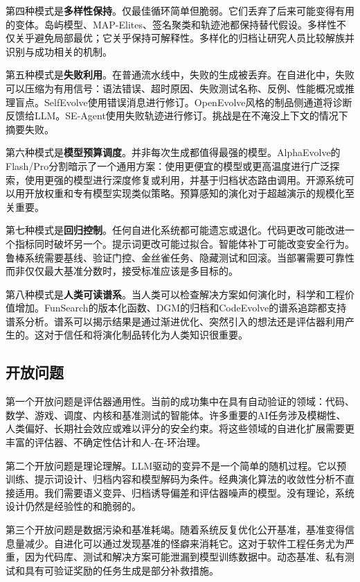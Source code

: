 第四种模式是\textbf{多样性保持}。仅最佳循环简单但脆弱。它们丢弃了后来可能变得有用的变体。岛屿模型、MAP-Elites、签名聚类和轨迹池都保持替代假设。多样性不仅关乎避免局部最优；它关乎保持可解释性。多样化的归档让研究人员比较解族并识别与成功相关的机制。

第五种模式是\textbf{失败利用}。在普通流水线中，失败的生成被丢弃。在自进化中，失败可以压缩为有用信号：语法错误、超时原因、失败测试名称、反例、性能概况或推理盲点。SelfEvolve使用错误消息进行修订。OpenEvolve风格的制品侧通道将诊断反馈给LLM。SE-Agent使用失败轨迹进行修订。挑战是在不淹没上下文的情况下摘要失败。

第六种模式是\textbf{模型预算调度}。并非每次生成都值得最强的模型。AlphaEvolve的Flash/Pro分割暗示了一个通用方案：使用更便宜的模型或更高温度进行广泛探索，使用更强的模型进行深度修复或利用，并基于归档状态路由调用。开源系统可以用开放权重和专有模型实现类似策略。预算感知的演化对于超越演示的规模化至关重要。

第七种模式是\textbf{回归控制}。任何自进化系统都可能遗忘或退化。代码更改可能改进一个指标同时破坏另一个。提示词更改可能过拟合。智能体补丁可能改变安全行为。鲁棒系统需要基线、验证门控、金丝雀任务、隐藏测试和回滚。当部署需要可靠性而非仅仅最大基准分数时，接受标准应该是多目标的。

第八种模式是\textbf{人类可读谱系}。当人类可以检查解决方案如何演化时，科学和工程价值增加。FunSearch的版本化函数、DGM的归档和CodeEvolve的谱系追踪都支持谱系分析。谱系可以揭示结果是通过渐进优化、突然引入的想法还是评估器利用产生的。这对于信任和将演化制品转化为人类知识很重要。

\subsection{开放问题}
\label{subsec:evolution-open-problems}

第一个开放问题是评估器通用性。当前的成功集中在具有自动验证的领域：代码、数学、游戏、调度、内核和基准测试的智能体。许多重要的AI任务涉及模糊性、人类偏好、长期社会效应或难以评分的安全约束。将这些领域的自进化扩展需要更丰富的评估器、不确定性估计和人-在-环治理。

第二个开放问题是理论理解。LLM驱动的变异不是一个简单的随机过程。它以预训练、提示词设计、归档内容和模型解码为条件。经典演化算法的收敛性分析不直接适用。我们需要语义变异、归档诱导偏差和评估器噪声的模型。没有理论，系统设计仍然是经验性的和脆弱的。

第三个开放问题是数据污染和基准耗竭。随着系统反复优化公开基准，基准变得信息量减少。自进化可以通过发现基准的怪癖来消耗它。这对于软件工程任务尤为严重，因为代码库、测试和解决方案可能泄漏到模型训练数据中。动态基准、私有测试和具有可验证奖励的任务生成是部分补救措施。

